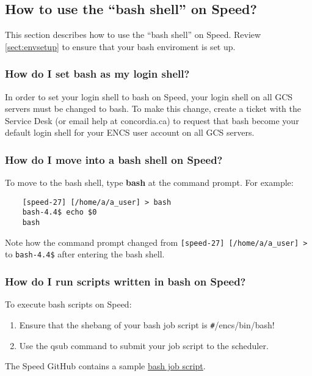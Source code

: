 \documentclass{easychair}
\begin{document}
\subsection{How to use the ``bash shell'' on Speed?}

This section describes how to use the ``bash shell'' on Speed. Review \autoref{sect:envsetup} to ensure that your bash enviroment is set up.

\subsubsection{How do I set bash as my login shell?}
In order to set your login shell to bash on Speed, your login shell on all GCS servers must be changed to bash.
To make this change, create a ticket with the Service Desk (or email help at concordia.ca) to request that bash become your default login shell for your ENCS user account on all GCS servers.

\subsubsection{How do I move into a bash shell on Speed?}
To move to the bash shell, type \textbf{bash} at the command prompt.
For example:
\begin{verbatim}
	[speed-27] [/home/a/a_user] > bash
	bash-4.4$ echo $0
	bash
\end{verbatim}	

Note how the command prompt changed from \verb![speed-27] [/home/a/a_user] >! to \verb!bash-4.4$! after entering the bash shell.

\subsubsection{How do I run scripts written in bash on Speed?}
To execute bash scripts on Speed:
\begin{enumerate}
	\item 
Ensure that the shebang of your bash job script is \verb!#!/encs/bin/bash!
	\item 
Use the qsub command to submit your job script to the scheduler.
\end{enumerate}

The Speed GitHub contains a sample \href{https://github.com/NAG-DevOps/speed-hpc/blob/master/src/bash.sh}{bash job script}.  
\end{document}
